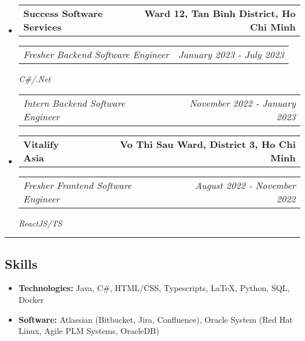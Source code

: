 \documentclass[11pt,letterpaper]{article}
\makeatletter
\newcommand{\headerrow}[2]
{\begin{tabular*}{\linewidth}{l@{\extracolsep{\fill}}r}
#1 &
#2 \\
\end{tabular*}}
\makeatother
\begin{document}
\begin{itemize}[leftmargin=1em]
    \item
          \headerrow
          {\textbf{Success Software Services}}
          {\textbf{Ward 12, Tan Binh District, Ho Chi Minh}}
          \headerrow
          {\emph{Fresher Backend Software Engineer}}
          {\emph{January 2023 - July 2023}}
          {\emph{C\#/.Net}}
          \headerrow
          {\emph{Intern Backend Software Engineer}}
          {\emph{November 2022 - January 2023}}

    \item
          \headerrow
          {\textbf{Vitalify Asia}}
          {\textbf{Vo Thi Sau Ward, District 3, Ho Chi Minh}}
          \headerrow
          {\emph{Fresher Frontend Software Engineer}}
          {\emph{August 2022 - November 2022}}
          {\emph{ReactJS/TS}}

\end{itemize}

\hrule
\vspace{-1em}
\subsection*{\Large Skills}

\begin{itemize}[leftmargin=1em,noitemsep]
    \item \textbf{Technologies:}
          Java, C\#, HTML/CSS, Typescripts, \LaTeX, Python, SQL, Docker
    \item \textbf{Software:}
          Atlassian (Bitbucket, Jira, Confluence), Oracle System (Red Hat Linux, Agile PLM Systems, OracleDB)
\end{itemize}
\end{document}
